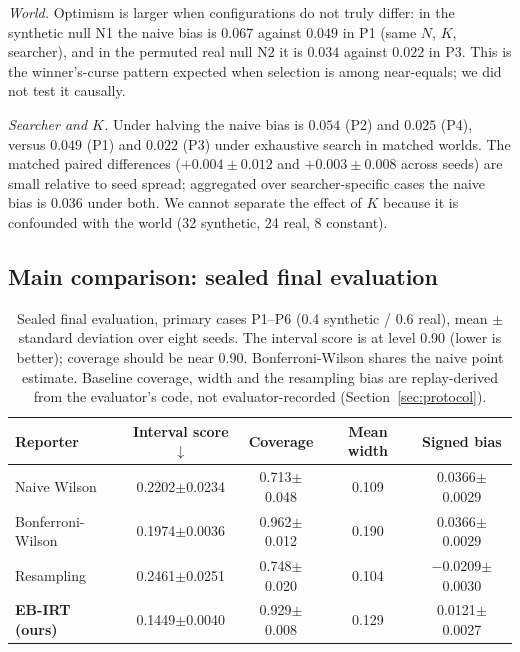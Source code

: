 \documentclass{article}
\begin{document}
\emph{World.} Optimism is larger when configurations do not truly differ: in the synthetic null N1 the naive bias is $0.067$ against $0.049$ in P1 (same $N$, $K$, searcher), and in the permuted real null N2 it is $0.034$ against $0.022$ in P3. This is the winner's-curse pattern expected when selection is among near-equals; we did not test it causally.

\emph{Searcher and $K$.} Under halving the naive bias is $0.054$ (P2) and $0.025$ (P4), versus $0.049$ (P1) and $0.022$ (P3) under exhaustive search in matched worlds. The matched paired differences ($+0.004\pm0.012$ and $+0.003\pm0.008$ across seeds) are small relative to seed spread; aggregated over searcher-specific cases the naive bias is $0.036$ under both. We cannot separate the effect of $K$ because it is confounded with the world (32 synthetic, 24 real, 8 constant).

\subsection{Main comparison: sealed final evaluation}
\begin{table}[t]
\centering
\caption{Sealed final evaluation, primary cases P1--P6 (0.4 synthetic / 0.6 real), mean $\pm$ standard deviation over eight seeds. The interval score is at level 0.90 (lower is better); coverage should be near 0.90. Bonferroni-Wilson shares the naive point estimate. Baseline coverage, width and the resampling bias are replay-derived from the evaluator's code, not evaluator-recorded (Section~\ref{sec:protocol}).}
\label{tab:aggregate}
\small
\begin{tabular}{lcccc}
\toprule
Reporter & Interval score $\downarrow$ & Coverage & Mean width & Signed bias \\
\midrule
Naive Wilson & 0.2202$\pm$0.0234 & 0.713$\pm$0.048 & 0.109 & 0.0366$\pm$0.0029 \\
Bonferroni-Wilson & 0.1974$\pm$0.0036 & 0.962$\pm$0.012 & 0.190 & 0.0366$\pm$0.0029 \\
Resampling & 0.2461$\pm$0.0251 & 0.748$\pm$0.020 & 0.104 & $-$0.0209$\pm$0.0030 \\
\textbf{EB-IRT (ours)} & 0.1449$\pm$0.0040 & 0.929$\pm$0.008 & 0.129 & 0.0121$\pm$0.0027 \\
\bottomrule
\end{tabular}
\end{table}
\end{document}
